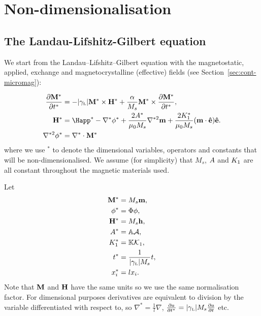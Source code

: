 
\section{Non-dimensionalisation}
\label{sec:normalisations-appendix}



\subsection{The Landau-Lifshitz-Gilbert equation}
\label{sec:land-lifsh-gilb-normalisation}

We start from the Landau--Lifshitz--Gilbert equation with the magnetostatic, applied, exchange and magnetocrystalline (effective) fields (see Section~\ref{sec:cont-micromag}):

\begin{align}
  \pd{\Mv^*}{t^*} &= - \gymagc \Mv^* \times \Hv^* + \frac{\alpha}{M_s} \Mv^* \times \pd{\Mv^*}{t^*}, \label{eqn:llgnd} \\
  \Hv^* &= \Happ^* - \nabla^* \phi^* + \frac{2\Exchc^*}{\mu_0 M_s} \nabla^{*2} \mv + \frac{2\Kone^*}{\mu_0 M_s} (\mv \cdot \ev) \ev.
  \label{eqn:effnd} \\
  \nabla^{*2} \phi^* &= \nabla^* \cdot \Mv^* \label{eqn:phind}
\end{align}
where we use $^*$ to denote the dimensional variables, operators and constants that will be non-dimensionalised. We assume (for simplicity) that $M_s$, $A$ and $K_1$ are all
constant throughout the magnetic materials used.

Let
\begin{align}
  \mathbf{M}^* &= M_s \mathbf{m}, \notag \\
  \phi^* &= \Phi \phi, \notag \\
  \mathbf{H}^* &= M_s \mathbf{h}, \label{eqn:nddefs} \\
  A^* &= \mathbb{A} \mathcal{A}, \notag \\
  K_1^* &= \mathbb{K} \mathcal{K}_1, \notag \\
  t^* &= \frac{1}{{|\gamma_{\text{\tiny{L}}}|} M_s} t, \notag \\
  x_i^* &= l x_i. \notag
\end{align}
Note that $\mathbf{M}$ and $\mathbf{H}$ have the same units so we use the same normalisation factor. For dimensional purposes derivatives are equivalent to division by the variable differentiated with respect to, so $\nabla^* = \frac{1}{l} \nabla$, $\frac{\partial a}{\partial t^*} = {|\gamma_{\text{\tiny{L}}}|} M_s \frac{\partial a}{\partial t}$ etc.

